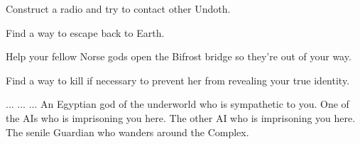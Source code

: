 \documentclass[char]{guardians}
\begin{document}



\begin{itemz}[Goals]
  \item Construct a radio and try to contact other Undoth.
  \item Find a way to escape back to Earth.
  \item Help your fellow Norse gods open the Bifrost bridge so they're out of your way.
  \item Find a way to kill \cAmaterasu{} if necessary to prevent her from revealing your true identity.
\end{itemz}

\begin{contacts}
  \contact{\cOdin{}} ...
  \contact{\cHel{}} ...
  \contact{\cVal{}} ...
  \contact{\cAnubis{}} An Egyptian god of the underworld who is sympathetic to you.
   One of the AIs who is imprisoning you here.
   The other AI who is imprisoning you here.
  \contact{\cJascha{}} The senile Guardian who wanders around the Complex.
\end{contacts}
\end{document}

